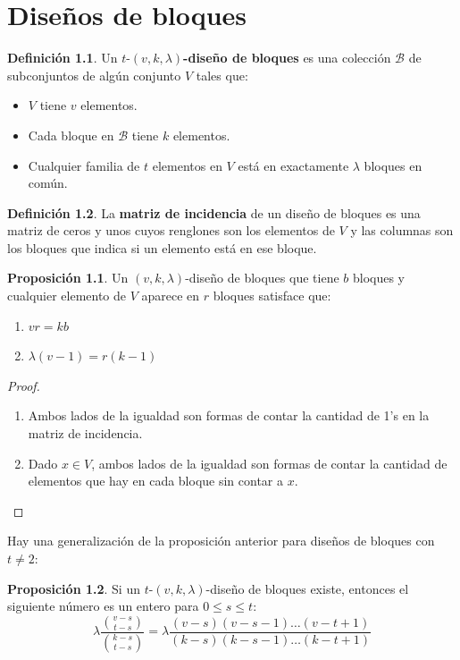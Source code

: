 \documentclass[spanish]{book}
\theoremstyle{definition}
\newtheorem*{defn}{Definición}
\newtheorem*{prop}{Proposición}
\begin{document}
\chapter{Diseños de bloques}
\begin{defn}
	Un $t$-$(v,k,\lambda)$\textbf{-diseño de bloques} es una colección $\mathcal{B}$ de subconjuntos de algún conjunto $V$ tales que:
	\begin{itemize}
		\item $V$ tiene $v$ elementos.
		\item Cada bloque en $\mathcal{B}$ tiene $k$ elementos.
		\item Cualquier familia de $t$ elementos en $V$ está en exactamente $\lambda$ bloques en común.
	\end{itemize}
\end{defn}
\begin{defn}
	La \textbf{matriz de incidencia} de un diseño de bloques es una matriz de ceros y unos cuyos renglones son los elementos de $V$ y las columnas son los bloques que indica si un elemento está en ese bloque.
\end{defn}
\begin{prop}
	Un $(v,k,\lambda)$-diseño de bloques que tiene $b$ bloques y cualquier elemento de $V$ aparece en $r$ bloques satisface que:
	\begin{enumerate}
		\item $vr=kb$
		\item $\lambda(v-1)=r(k-1)$
	\end{enumerate}
\end{prop}
\begin{proof}\leavevmode
	\begin{enumerate}
		\item Ambos lados de la igualdad son formas de contar la cantidad de 1's en la matriz de incidencia.
		\item Dado $x\in V$, ambos lados de la igualdad son formas de contar la cantidad de elementos que hay en cada bloque sin contar a $x$.
	\end{enumerate}
\end{proof}
Hay una generalización de la proposición anterior para diseños de bloques con $t\neq2$:
\begin{prop}
	Si un $t$-$(v,k,\lambda)$-diseño de bloques existe, entonces el siguiente número es un entero para $0\leq s\leq t$:
	\[\lambda\frac{{v-s\choose t-s}}{{k-s\choose t-s}}=\lambda\frac{(v-s)(v-s-1)\ldots(v-t+1)}{(k-s)(k-s-1)\ldots(k-t+1)}\]
\end{prop}
\end{document}
